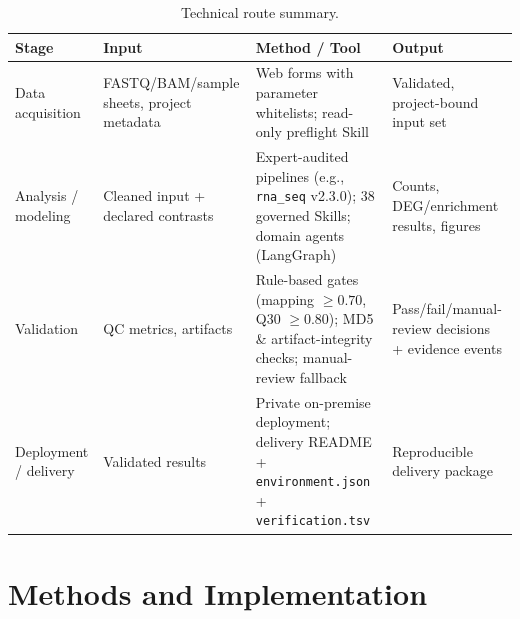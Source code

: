 \documentclass[11pt,a4paper]{article}
\begin{document}
\begin{table}[h]
\centering
\renewcommand{\arraystretch}{1.25}
\begin{tabularx}{\textwidth}{p{}X X X}
\toprule
\textbf{Stage} & \textbf{Input} & \textbf{Method / Tool} & \textbf{Output}\\
\midrule
Data acquisition & FASTQ/BAM/sample sheets, project metadata & Web forms with parameter whitelists; read-only preflight Skill & Validated, project-bound input set\\
Analysis / modeling & Cleaned input + declared contrasts & Expert-audited pipelines (e.g., \texttt{rna\_seq} v2.3.0); 38 governed Skills; domain agents (LangGraph) & Counts, DEG/enrichment results, figures\\
Validation & QC metrics, artifacts & Rule-based gates (mapping $\geq 0.70$, Q30 $\geq 0.80$); MD5 \& artifact-integrity checks; manual-review fallback & Pass/fail/manual-review decisions + evidence events\\
Deployment / delivery & Validated results & Private on-premise deployment; delivery README + \texttt{environment.json} + \texttt{verification.tsv} & Reproducible delivery package\\
\bottomrule
\end{tabularx}
\caption{Technical route summary.}
\end{table}

\section{Methods and Implementation}
\end{document}
